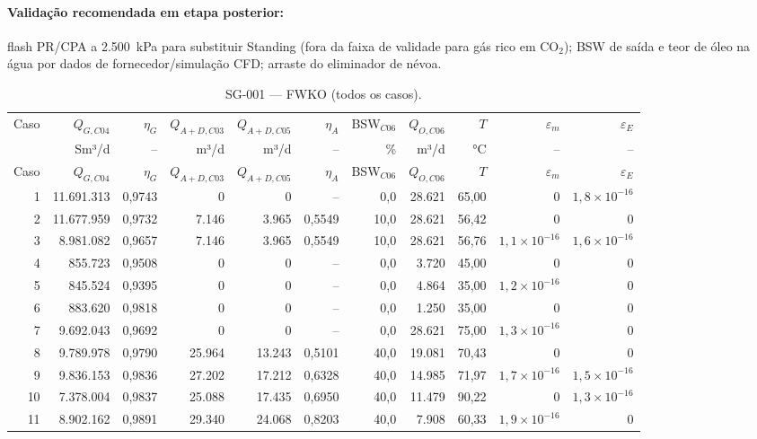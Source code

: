 \documentclass[11pt,a4paper]{article}
\numberwithin{equation}{section}
\numberwithin{table}{section}
\numberwithin{figure}{section}
\begin{document}
\paragraph{Validação recomendada em etapa posterior:} flash PR/CPA a 2.500~\si{\kilo\pascal} para substituir Standing (fora da faixa de validade para gás rico em CO$_2$); BSW de saída e teor de óleo na água por dados de fornecedor/simulação CFD; arraste do eliminador de névoa.
{\footnotesize\setlength{\tabcolsep}{3.5pt}\begin{longtable}{rrrrrrrrrrr}
\caption{SG-001 --- FWKO (todos os casos).\label{tab:b02}}\\\toprule
Caso & $Q_{G,C04}$ & $\eta_G$ & $Q_{A+D,C03}$ & $Q_{A+D,C05}$ & $\eta_A$ & BSW$_{C06}$ & $Q_{O,C06}$ & $T$ & $\varepsilon_m$ & $\varepsilon_E$\\
 & Sm³/d & -- & m³/d & m³/d & -- & \% & m³/d & °C & -- & --\\\midrule\endfirsthead
\toprule Caso & $Q_{G,C04}$ & $\eta_G$ & $Q_{A+D,C03}$ & $Q_{A+D,C05}$ & $\eta_A$ & BSW$_{C06}$ & $Q_{O,C06}$ & $T$ & $\varepsilon_m$ & $\varepsilon_E$\\\midrule\endhead
1 & 11.691.313 & 0,9743 & 0 & 0 & -- & 0,0 & 28.621 & 65,00 & $0$ & $1{,}8\times10^{-16}$\\
2 & 11.677.959 & 0,9732 & 7.146 & 3.965 & 0,5549 & 10,0 & 28.621 & 56,42 & $0$ & $0$\\
3 & 8.981.082 & 0,9657 & 7.146 & 3.965 & 0,5549 & 10,0 & 28.621 & 56,76 & $1{,}1\times10^{-16}$ & $1{,}6\times10^{-16}$\\
4 & 855.723 & 0,9508 & 0 & 0 & -- & 0,0 & 3.720 & 45,00 & $0$ & $0$\\
5 & 845.524 & 0,9395 & 0 & 0 & -- & 0,0 & 4.864 & 35,00 & $1{,}2\times10^{-16}$ & $0$\\
6 & 883.620 & 0,9818 & 0 & 0 & -- & 0,0 & 1.250 & 35,00 & $0$ & $0$\\
7 & 9.692.043 & 0,9692 & 0 & 0 & -- & 0,0 & 28.621 & 75,00 & $1{,}3\times10^{-16}$ & $0$\\
8 & 9.789.978 & 0,9790 & 25.964 & 13.243 & 0,5101 & 40,0 & 19.081 & 70,43 & $0$ & $0$\\
9 & 9.836.153 & 0,9836 & 27.202 & 17.212 & 0,6328 & 40,0 & 14.985 & 71,97 & $1{,}7\times10^{-16}$ & $1{,}5\times10^{-16}$\\
10 & 7.378.004 & 0,9837 & 25.088 & 17.435 & 0,6950 & 40,0 & 11.479 & 90,22 & $0$ & $1{,}3\times10^{-16}$\\
11 & 8.902.162 & 0,9891 & 29.340 & 24.068 & 0,8203 & 40,0 & 7.908 & 60,33 & $1{,}9\times10^{-16}$ & $0$\\

\end{longtable}}
\end{document}
